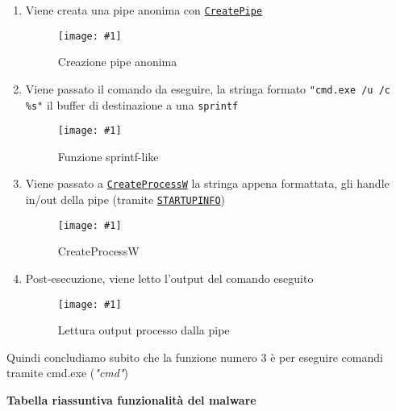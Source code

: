 \documentclass[
    a4paper, %
    11pt %
]{article}
\newcommand{\pic}[4]{\begin{figure}[H]
            \centering
            \texttt{[image: \#1]}
            \caption{#2}
            \label{fig:#1}
            \end{figure}}
\begin{document}
            \begin{enumerate}
                \item Viene creata una pipe anonima con \href{https://learn.microsoft.com/it-it/windows/win32/api/
                    namedpipeapi/nf-namedpipeapi-createpipe}{\texttt{CreatePipe}}
                    \pic{fn3_namedpipe}{Creazione pipe anonima}{17cm}{2.5cm}
                \item Viene passato il comando da eseguire, la stringa formato \texttt{"cmd.exe /u /c \%s"} il
                    buffer di destinazione a una \texttt{sprintf}
                    \pic{fn3_cmd_snprintf}{Funzione sprintf-like}{17cm}{1.5cm}
                \item Viene passato a \href{https://learn.microsoft.com/it-it/windows/win32/api/processthreadsapi/      
                        nf-processthreadsapi-createprocessw}{\texttt{CreateProcessW}} 
                        la stringa appena formattata, gli handle in/out della pipe (tramite \href{https://stackoverflow.com/questions/42402673/createprocess-and-capture-stdout}
                        {\texttt{STARTUPINFO}})
                        \pic{fn3_createprocess}{CreateProcessW}{16cm}{4cm}
                \item  Post-esecuzione, viene letto l'output del comando eseguito
                    \pic{fn3_readout}{Lettura output processo dalla pipe}{14cm}{3cm}
            \end{enumerate}

            Quindi concludiamo subito che la funzione numero 3 è per eseguire comandi tramite cmd.exe (\textit{"cmd"})
            
            \textbf{Tabella riassuntiva funzionalità del malware}
\end{document}

